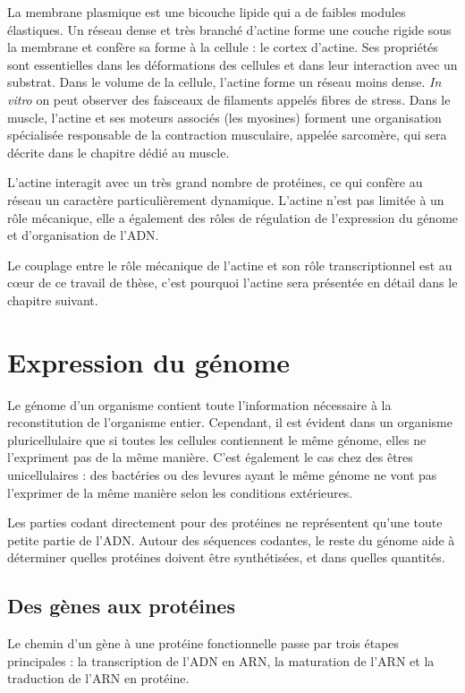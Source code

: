 La membrane plasmique est une bicouche lipide qui a de faibles modules élastiques. Un réseau dense et très branché d'actine forme une couche rigide sous la membrane et confère sa forme à la cellule : le cortex d'actine. Ses propriétés sont essentielles dans les déformations des cellules et dans leur interaction avec un substrat. 
Dans le volume de la cellule, l'actine forme un réseau moins dense. \textit{In vitro} on peut observer des faisceaux de filaments appelés fibres de stress. 
Dans le muscle, l'actine et ses moteurs associés (les myosines) forment une organisation spécialisée responsable de la contraction musculaire, appelée sarcomère, qui sera décrite dans le chapitre dédié au muscle.

L'actine interagit avec un très grand nombre de protéines, ce qui confère au réseau un caractère particulièrement dynamique. L'actine n'est pas limitée à un rôle mécanique, elle a également des rôles de régulation de l'expression du génome et d'organisation de l'ADN. 

Le couplage entre le rôle mécanique de l'actine et son rôle transcriptionnel est au c\oe ur de ce travail de thèse, c'est pourquoi l'actine sera présentée en détail dans le chapitre suivant. 




\section{Expression du génome}

Le génome d'un organisme contient toute l'information nécessaire à la reconstitution de l'organisme entier. Cependant, il est évident dans un organisme pluricellulaire que si toutes les cellules contiennent le même génome, elles ne l'expriment pas de la même manière. C'est également le cas chez des êtres unicellulaires : des bactéries ou des levures ayant le même génome ne vont pas l'exprimer de la même manière selon les conditions extérieures. 

Les parties codant directement pour des protéines ne représentent qu'une toute petite partie de l'ADN. Autour des séquences codantes, le reste du génome aide à déterminer quelles protéines doivent être synthétisées, et dans quelles quantités. 

\subsection{Des gènes aux protéines}

Le chemin d'un gène à une protéine fonctionnelle passe par trois étapes principales : la transcription de l'ADN en ARN, la maturation de l'ARN et la traduction de l'ARN en protéine.

